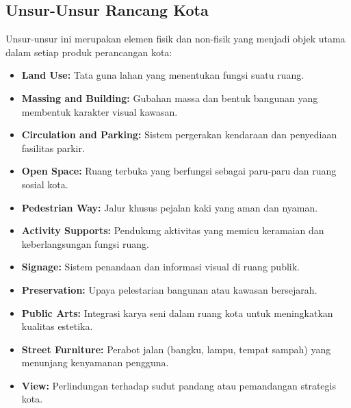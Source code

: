 \documentclass[../rumukota.tex]{subfiles}
\begin{document}
\subsection{Unsur-Unsur Rancang Kota}
Unsur-unsur ini merupakan elemen fisik dan non-fisik yang menjadi objek utama dalam setiap produk perancangan kota:
\begin{itemize}
	\item \textbf{Land Use:} Tata guna lahan yang menentukan fungsi suatu ruang.
	\item \textbf{Massing and Building:} Gubahan massa dan bentuk bangunan yang membentuk karakter visual kawasan.
	\item \textbf{Circulation and Parking:} Sistem pergerakan kendaraan dan penyediaan fasilitas parkir.
	\item \textbf{Open Space:} Ruang terbuka yang berfungsi sebagai paru-paru dan ruang sosial kota.
	\item \textbf{Pedestrian Way:} Jalur khusus pejalan kaki yang aman dan nyaman.
	\item \textbf{Activity Supports:} Pendukung aktivitas yang memicu keramaian dan keberlangsungan fungsi ruang.
	\item \textbf{Signage:} Sistem penandaan dan informasi visual di ruang publik.
	\item \textbf{Preservation:} Upaya pelestarian bangunan atau kawasan bersejarah.
	\item \textbf{Public Arts:} Integrasi karya seni dalam ruang kota untuk meningkatkan kualitas estetika.
	\item \textbf{Street Furniture:} Perabot jalan (bangku, lampu, tempat sampah) yang menunjang kenyamanan pengguna.
	\item \textbf{View:} Perlindungan terhadap sudut pandang atau pemandangan strategis kota.
\end{itemize}
\end{document}
